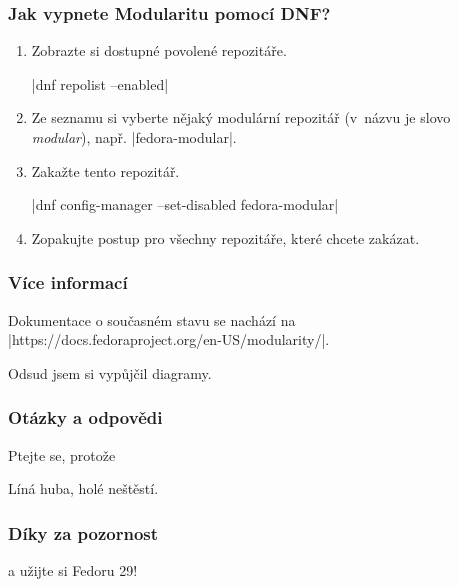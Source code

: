 \documentclass[12pt]{beamer}
\begin{document}
\begin{frame}[fragile]
\frametitle{Jak vypnete Modularitu pomocí DNF?}

\begin{enumerate}
	\item Zobrazte si dostupné povolené repozitáře.
	
	\tc|dnf repolist --enabled|
	\item Ze seznamu si vyberte nějaký modulární repozitář (v~názvu je slovo \textit{modular}), např. \tc|fedora-modular|.
	\item Zakažte tento repozitář.
	
	\tc|dnf config-manager --set-disabled fedora-modular|
	\item Zopakujte postup pro všechny repozitáře, které chcete zakázat.
\end{enumerate}
\end{frame}

\begin{frame}[fragile]
\frametitle{Více informací}
	Dokumentace o současném stavu se nachází na \tc|https://docs.fedoraproject.org/en-US/modularity/|.
	
	Odsud jsem si vypůjčil diagramy.
\end{frame}

\begin{frame}
\frametitle{Otázky a odpovědi}

Ptejte se, protože

\begin{center}
	\Huge{Líná huba, holé neštěstí.}
\end{center}
\end{frame}

\begin{frame}
\frametitle{Díky za pozornost}
\begin{center}
	\Huge{a užijte si Fedoru 29!}
\end{center}
\end{frame}
\end{document}
